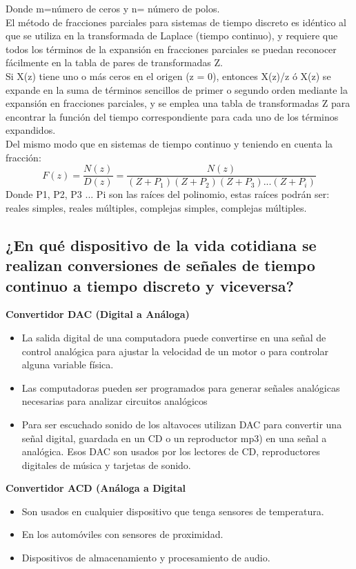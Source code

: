 Donde m=número de ceros y n= número de polos.\\    
El método de fracciones parciales para sistemas de tiempo discreto es idéntico al que se utiliza en la transformada de Laplace (tiempo continuo), y requiere que todos los términos de la expansión en fracciones parciales se puedan reconocer fácilmente en la tabla de pares de transformadas Z.\\
Si X(z) tiene uno o más ceros en el origen (z = 0), entonces X(z)/z ó X(z) se expande en la suma de términos sencillos de primer o segundo orden mediante la expansión en fracciones parciales, y se emplea una tabla de transformadas Z para encontrar la función del tiempo correspondiente para cada uno de los términos expandidos.\\    
Del mismo modo que en sistemas de tiempo continuo y teniendo en cuenta la fracción:\\
\[
F(z)=\frac{N(z)}{D(z)}=\frac{N(z)}{(Z+P_{1})(Z+P_{2})(Z+P_{3})...(Z+P_{i})}
\]
Donde P1, P2, P3 ... Pi son las raíces del polinomio, estas raíces podrán ser: reales simples, reales múltiples, complejas simples, complejas múltiples.

\subsection{¿En qué dispositivo de la vida cotidiana se realizan conversiones de señales de tiempo continuo a tiempo discreto y viceversa?}

	
	\textbf{Convertidor DAC (Digital a Análoga)}
	\begin{itemize}
		\item La salida digital de una computadora puede convertirse en una señal de control analógica para ajustar la velocidad de un motor o para controlar alguna variable física.
		\item Las computadoras pueden ser programados para generar señales analógicas necesarias para analizar circuitos analógicos
		\item Para ser escuchado sonido de los altavoces utilizan DAC para convertir una señal digital, guardada en un CD o un reproductor mp3) en una señal a analógica. Esos DAC son usados por los lectores de CD, reproductores digitales de música y tarjetas de sonido.
	\end{itemize}
	
	\textbf{Convertidor ACD (Análoga a Digital}
	\begin{itemize}
		\item Son usados en cualquier dispositivo que tenga sensores de temperatura.
		\item En los automóviles con sensores de proximidad.
		\item Dispositivos de almacenamiento y procesamiento de audio.
	\end{itemize}
	

